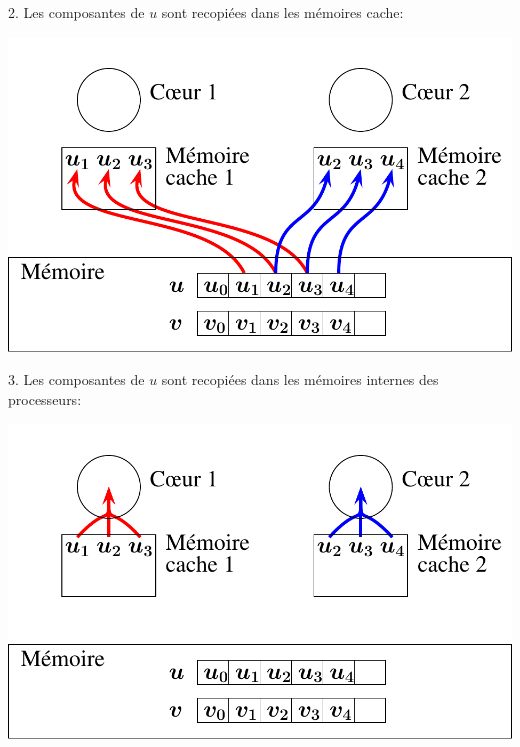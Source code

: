 \documentclass{beamer}
\begin{document}
\begin{frame}
	\parbox[t][1cm]{10cm}{2. Les composantes de $u$ sont recopiées dans les mémoires cache:}
   \begin{center}
	\includegraphics[scale=0.6]{../Images/multithread1}
   \end{center}
\end{frame}

\begin{frame}
	\parbox[t][1cm]{10cm}{3. Les composantes de $u$ sont recopiées dans les mémoires internes des processeurs:}
   \begin{center}
	\includegraphics[scale=0.6]{../Images/multithread2}
   \end{center}
\end{frame}
\end{document}
